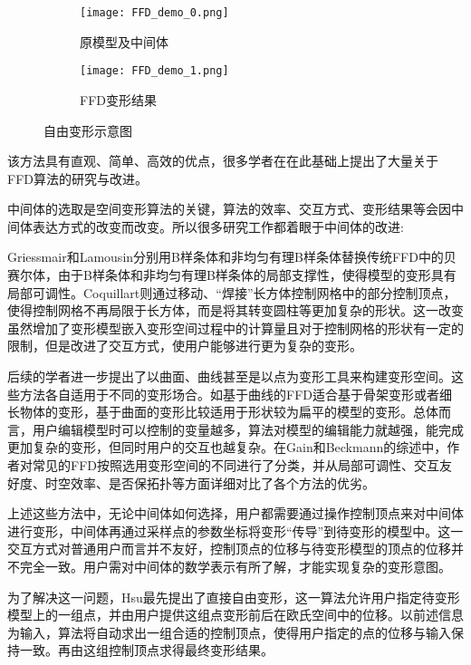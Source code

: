 \begin{figure}[htbp]
	\centering
	\begin{subfigure}[b]{.4\textwidth}
		\centering
		\texttt{[image: FFD\_demo\_0.png]}
		\caption{原模型及中间体}\label{subfig:FFD_demo_0}
	\end{subfigure}
	\quad
	\begin{subfigure}[b]{.4\textwidth}
		\centering
		\texttt{[image: FFD\_demo\_1.png]}
		\caption{FFD变形结果}\label{subfig:FFD_demo_1}
	\end{subfigure}
    \caption{自由变形示意图}\label{fig:FFD_demo}
\end{figure}

该方法具有直观、简单、高效的优点，很多学者在在此基础上提出了大量关于FFD算法的研究与改进。

中间体的选取是空间变形算法的关键，算法的效率、交互方式、变形结果等会因中间体表达方式的改变而改变。所以很多研究工作都着眼于中间体的改进:

Griessmair\cite{Griessmair89}和Lamousin\cite{lamousin1994}分别用B样条体和非均匀有理B样条体替换传统FFD\cite{Sederberg86}中的贝赛尔体，由于B样条体和非均匀有理B样条体的局部支撑性，使得模型的变形具有局部可调性。Coquillart\cite{coquillart1990}则通过移动、“焊接”长方体控制网格中的部分控制顶点，使得控制网格不再局限于长方体，而是将其转变圆柱等更加复杂的形状。这一改变虽然增加了变形模型嵌入变形空间过程中的计算量且对于控制网格的形状有一定的限制，但是改进了交互方式，使用户能够进行更为复杂的变形。

后续的学者进一步提出了以曲面、曲线甚至是以点为变形工具来构建变形空间。这些方法各自适用于不同的变形场合。如基于曲线的FFD适合基于骨架变形或者细长物体的变形，基于曲面的变形比较适用于形状较为扁平的模型的变形。总体而言，用户编辑模型时可以控制的变量越多，算法对模型的编辑能力就越强，能完成更加复杂的变形，但同时用户的交互也越复杂。在Gain和Beckmann的综述\cite{Gain08}中，作者对常见的FFD按照选用变形空间的不同进行了分类，并从局部可调性、交互友好度、时空效率、是否保拓扑等方面详细对比了各个方法的优劣。

上述这些方法中，无论中间体如何选择，用户都需要通过操作控制顶点来对中间体进行变形，中间体再通过采样点的参数坐标将变形“传导”到待变形的模型中。这一交互方式对普通用户而言并不友好，控制顶点的位移与待变形模型的顶点的位移并不完全一致。用户需对中间体的数学表示有所了解，才能实现复杂的变形意图。

为了解决这一问题，Hsu\cite{hsu1992}最先提出了直接自由变形，这一算法允许用户指定待变形模型上的一组点，并由用户提供这组点变形前后在欧氏空间中的位移。以前述信息为输入，算法将自动求出一组合适的控制顶点，使得用户指定的点的位移与输入保持一致。再由这组控制顶点求得最终变形结果。

